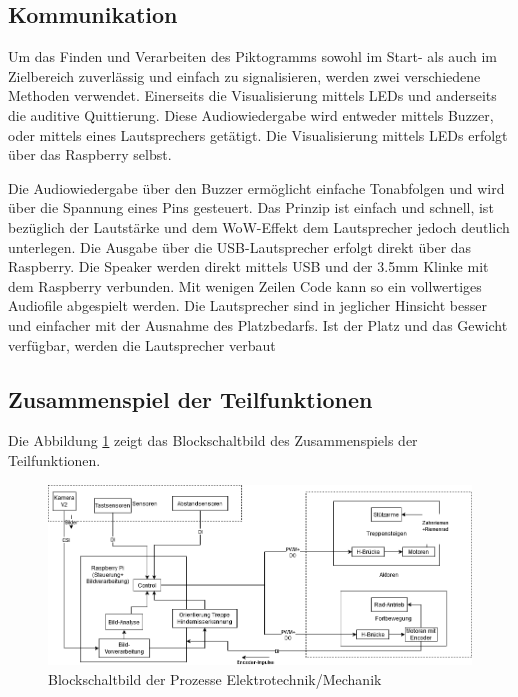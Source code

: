 \subsection {Kommunikation}

Um das Finden und Verarbeiten des Piktogramms sowohl im Start- als auch im Zielbereich zuverlässig und einfach zu signalisieren, werden zwei verschiedene Methoden verwendet. Einerseits die Visualisierung mittels LEDs und anderseits die auditive Quittierung. Diese Audiowiedergabe wird entweder mittels Buzzer, oder mittels eines Lautsprechers getätigt. Die Visualisierung mittels LEDs erfolgt über das Raspberry selbst.

Die Audiowiedergabe über den Buzzer ermöglicht einfache Tonabfolgen und wird über die Spannung eines Pins gesteuert. Das Prinzip ist einfach und schnell, ist bezüglich der Lautstärke und dem \glqq WoW-Effekt \grqq{} dem Lautsprecher jedoch deutlich unterlegen.
Die Ausgabe über die USB-Lautsprecher erfolgt direkt über das Raspberry. Die Speaker werden direkt mittels USB und der 3.5mm Klinke mit dem Raspberry verbunden. Mit wenigen Zeilen Code kann so ein vollwertiges Audiofile abgespielt werden.
Die Lautsprecher sind in jeglicher Hinsicht besser und einfacher mit der Ausnahme des Platzbedarfs. Ist der Platz und das Gewicht verfügbar, werden die Lautsprecher verbaut 

\newpage
\subsection{Zusammenspiel der Teilfunktionen}
 Die Abbildung \ref{fig3} zeigt das Blockschaltbild des Zusammenspiels der Teilfunktionen.

\begin{figure}[h]
  \includegraphics[width=\textwidth]{img/Funktionsmuster Treppensteigen/Blockschaltbild.png}
  \centering
  \caption{Blockschaltbild der Prozesse Elektrotechnik/Mechanik}
  \label{fig3}
\end{figure}

